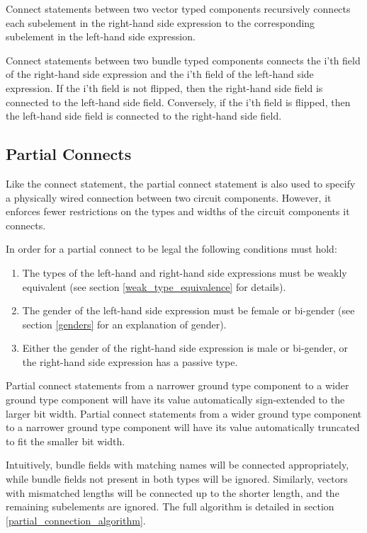 \documentclass[12pt]{article}
\begin{document}
Connect statements between two vector typed components recursively connects each subelement in the right-hand side expression to the corresponding subelement in the left-hand side expression. 

Connect statements between two bundle typed components connects the i'th field of the right-hand side expression and the i'th field of the left-hand side expression. If the i'th field is not flipped, then the right-hand side field is connected to the left-hand side field. Conversely, if the i'th field is flipped, then the left-hand side field is connected to the right-hand side field.

\subsection{Partial Connects}\label{partial_connects}
Like the connect statement, the partial connect statement is also used to specify a physically wired connection between two circuit components. However, it enforces fewer restrictions on the types and widths of the circuit components it connects. 

In order for a partial connect to be legal the following conditions must hold:
\begin{enumerate}
\item The types of the left-hand and right-hand side expressions must be weakly equivalent (see section \ref{weak_type_equivalence} for details).
\item The gender of the left-hand side expression must be female or bi-gender (see section \ref{genders} for an explanation of gender).
\item Either the gender of the right-hand side expression is male or bi-gender, or the right-hand side expression has a passive type.
\end{enumerate}

Partial connect statements from a narrower ground type component to a wider ground type component will have its value automatically sign-extended to the larger bit width. Partial connect statements from a wider ground type component to a narrower ground type component will have its value automatically truncated to fit the smaller bit width. 

Intuitively, bundle fields with matching names will be connected appropriately, while bundle fields not present in both types will be ignored. Similarly, vectors with mismatched lengths will be connected up to the shorter length, and the remaining subelements are ignored. The full algorithm is detailed in section \ref{partial_connection_algorithm}.
\end{document}
